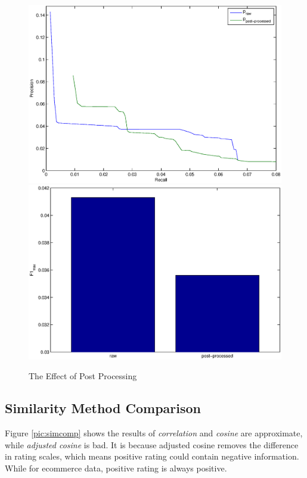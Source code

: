 \documentclass[11pt,a4paper,titlepage]{article}
\begin{document}
\begin{figure}[!h]
\includegraphics[width=\linewidth]{./post-proc.eps}
\includegraphics[width=\linewidth]{./post-proc_f1.eps}
\caption{The Effect of Post Processing}
\label{pic:post}
\end{figure}


\subsection{Similarity Method Comparison}

Figure \ref{pic:simcomp} shows the results of \emph{correlation} and \emph{cosine} are approximate, while \emph{adjusted cosine} is bad. It is because adjusted cosine removes the difference in rating scales, which means positive rating could contain negative information. While for ecommerce data, positive rating is always positive.
\end{document}
